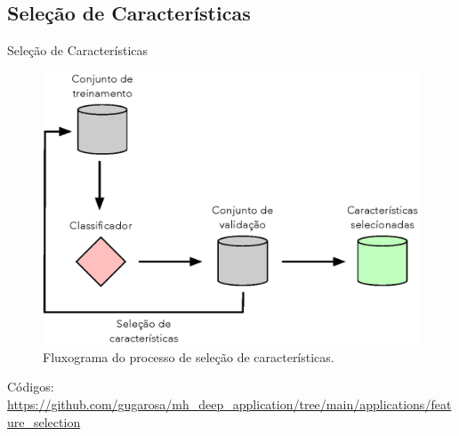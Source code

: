 \subsection{Seleção de Características}
\label{ss.applications_feature_selection}

\begin{frame}{Seleção de Características}
	\begin{figure}
		\centering
		\includegraphics[scale=0.45]{figs/feature_selection.eps}	
		\caption{Fluxograma do processo de seleção de características.}
		\label{f.feature_selection}
	\end{figure}
	Códigos: \url{https://github.com/gugarosa/mh_deep_application/tree/main/applications/feature_selection}
\end{frame}